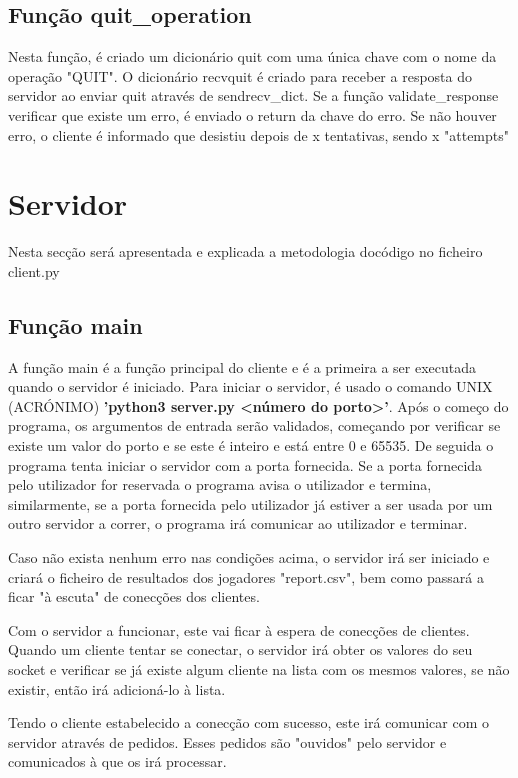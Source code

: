 \documentclass{report}
\begin{document}
\subsection{Função quit\_operation}
Nesta função, é criado um dicionário quit com uma única chave com o nome da operação "QUIT". O dicionário recvquit é criado
para receber a resposta do servidor ao enviar quit através de sendrecv\_dict. Se a função validate\_response verificar que existe
um erro, é enviado o return da chave do erro. Se não houver erro, o cliente é informado que desistiu depois de x tentativas,
sendo x "attempts"

\section{Servidor}
\label{sec:server}
Nesta secção será apresentada e explicada a metodologia docódigo no ficheiro client.py

\subsection{Função main}
\label{ssec:func_main}

A função main é a função principal do cliente e é a primeira a ser executada quando o servidor é iniciado. Para iniciar o servidor, é usado o comando UNIX (ACRÓNIMO) \textbf{'python3 server.py <número do porto>'}. Após o começo do programa, os argumentos de entrada serão validados, começando por verificar se existe um valor do porto e se este é inteiro e está entre 0 e 65535. De seguida o programa tenta iniciar o servidor com a porta fornecida. Se a porta fornecida pelo utilizador for reservada o programa avisa o utilizador e termina, similarmente, se a porta fornecida pelo utilizador já estiver a ser usada por um outro servidor a correr, o programa irá comunicar ao utilizador e terminar. 

Caso não exista nenhum erro nas condições acima, o servidor irá ser iniciado e criará o ficheiro de resultados dos jogadores "report.csv", bem como passará a ficar "à escuta" de conecções dos clientes.

Com o servidor a funcionar, este vai ficar à espera de conecções de clientes. Quando um cliente tentar se conectar, o servidor irá obter os valores do seu socket e verificar se já existe algum cliente na lista com os mesmos valores, se não existir, então irá adicioná-lo à lista.

Tendo o cliente estabelecido a conecção com sucesso, este irá comunicar com o servidor através de pedidos. Esses pedidos são "ouvidos" pelo servidor e comunicados à  que os irá processar.
\end{document}
